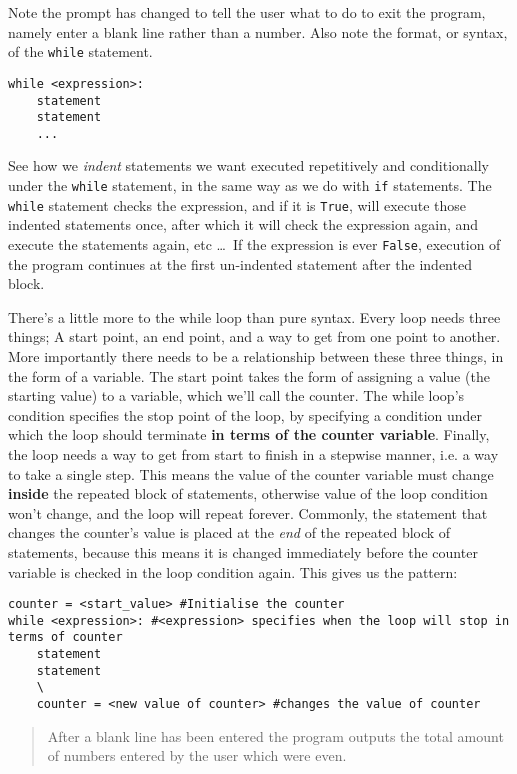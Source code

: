 Note the prompt has changed to tell the user what to do to exit the   program, namely enter a blank line rather than a number. Also note the   format, or syntax, of the \texttt{while} statement.
\begin{lstlisting}
while <expression>:
    statement
    statement
    ...
\end{lstlisting}

See how we \textit{indent} statements we want executed repetitively and   conditionally under the \texttt{while} statement, in the same way as we do with   \texttt{if} statements. The \texttt{while} statement checks the expression, and if it is   \texttt{True}, will execute those indented statements once, after which it will   check the expression again, and execute the statements again, etc \ldots\ If the   expression is ever \texttt{False}, execution of the program continues at the   first un-indented statement after the indented block.

There's a little more to the while loop than pure syntax. Every   loop needs three things; A start point, an end point, and a way to get   from one point to another. More importantly there needs to be a   relationship between these three things, in the form of a variable. The   start point takes the form of assigning a value (the starting value) to   a variable, which we'll call the counter. The while loop's condition   specifies the stop point of the loop, by specifying a condition under   which the loop should terminate \textbf{in terms of the counter   variable}. Finally, the loop needs a way to get from start to   finish in a stepwise manner, i.e. a way to take a single step. This   means the value of the counter variable must change   \textbf{inside} the repeated block of statements, otherwise   value of the loop condition won't change, and the loop will repeat   forever. Commonly, the statement that changes the counter's   value is placed at the \textit{end} of the repeated block of   statements, because this means it is changed immediately before the   counter variable is checked in the loop condition again. This gives us   the pattern:
\begin{lstlisting}
counter = <start_value> #Initialise the counter
while <expression>: #<expression> specifies when the loop will stop in terms of counter
    statement
    statement
    \
    counter = <new value of counter> #changes the value of counter
\end{lstlisting}
\begin{quotation}     After a blank line has been entered the program outputs the total amount    of numbers entered by the user which were even.    
\end{quotation}

